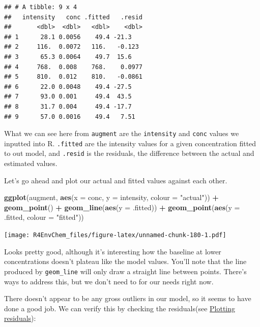 \documentclass[
]{book}
\newenvironment{Shaded}{\begin{snugshade}}{\end{snugshade}}
\newcommand{\AttributeTok}[1]{\textcolor[rgb]{0.13,0.29,0.53}{#1}}
\newcommand{\FunctionTok}[1]{\textcolor[rgb]{0.13,0.29,0.53}{\textbf{#1}}}
\newcommand{\NormalTok}[1]{#1}
\newcommand{\SpecialCharTok}[1]{\textcolor[rgb]{0.81,0.36,0.00}{\textbf{#1}}}
\newcommand{\StringTok}[1]{\textcolor[rgb]{0.31,0.60,0.02}{#1}}
\begin{document}
\begin{verbatim}
## # A tibble: 9 x 4
##   intensity   conc .fitted   .resid
##       <dbl>  <dbl>   <dbl>    <dbl>
## 1      28.1 0.0056    49.4 -21.3   
## 2     116.  0.0072   116.   -0.123 
## 3      65.3 0.0064    49.7  15.6   
## 4     768.  0.008    768.    0.0977
## 5     810.  0.012    810.   -0.0861
## 6      22.0 0.0048    49.4 -27.5   
## 7      93.0 0.001     49.4  43.5   
## 8      31.7 0.004     49.4 -17.7   
## 9      57.0 0.0016    49.4   7.51
\end{verbatim}

What we can see here from \texttt{augment} are the \texttt{intensity} and \texttt{conc} values we inputted into R. \texttt{.fitted} are the intensity values for a given concentration fitted to out model, and \texttt{.resid} is the residuals, the difference between the actual and estimated values.

Let's go ahead and plot our actual and fitted values against each other.

\begin{Shaded}
\begin{Highlighting}[]
\FunctionTok{ggplot}\NormalTok{(augment, }\FunctionTok{aes}\NormalTok{(}\AttributeTok{x =}\NormalTok{ conc, }\AttributeTok{y =}\NormalTok{ intensity, }\AttributeTok{colour =} \StringTok{"actual"}\NormalTok{)) }\SpecialCharTok{+}
  \FunctionTok{geom\_point}\NormalTok{() }\SpecialCharTok{+}
  \FunctionTok{geom\_line}\NormalTok{(}\FunctionTok{aes}\NormalTok{(}\AttributeTok{y =}\NormalTok{ .fitted)) }\SpecialCharTok{+}
  \FunctionTok{geom\_point}\NormalTok{(}\FunctionTok{aes}\NormalTok{(}\AttributeTok{y =}\NormalTok{ .fitted, }\AttributeTok{colour =} \StringTok{"fitted"}\NormalTok{)) }
\end{Highlighting}
\end{Shaded}

\texttt{[image: R4EnvChem\_files/figure-latex/unnamed-chunk-180-1.pdf]}

Looks pretty good, although it's interesting how the baseline at lower concentrations doesn't plateau like the model values. You'll note that the line produced by \texttt{geom\_line} will only draw a straight line between points. There's ways to address this, but we don't need to for our needs right now.

There doesn't appear to be any gross outliers in our model, so it seems to have done a good job. We can verify this by checking the residuals(see \protect\hyperlink{plotting-residuals}{Plotting residuals}):
\end{document}
